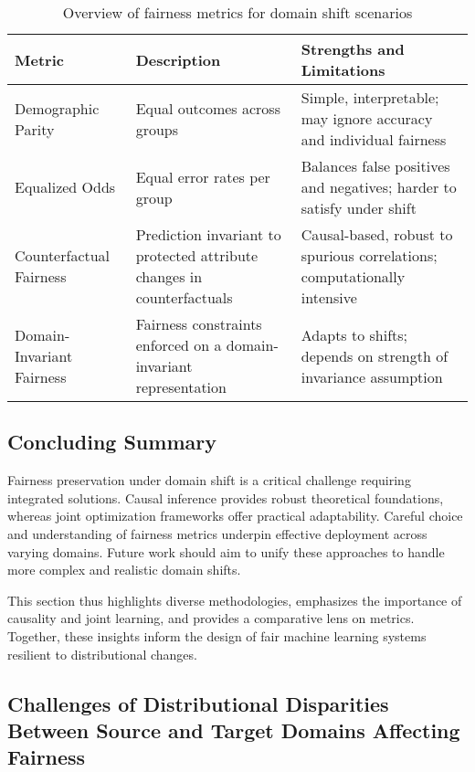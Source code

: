 \documentclass[sigconf]{acmart}
\begin{document}
\begin{table*}[htbp]
\centering
\caption{Overview of fairness metrics for domain shift scenarios}
\label{tab:fairness_domain_metrics}
\begin{adjustbox}{max width=\textwidth}
\begin{tabular}{@{}lll@{}}
\toprule
\textbf{Metric} & \textbf{Description} & \textbf{Strengths and Limitations} \\
\midrule
Demographic Parity & Equal outcomes across groups & Simple, interpretable; may ignore accuracy and individual fairness \\
Equalized Odds & Equal error rates per group & Balances false positives and negatives; harder to satisfy under shift \\
Counterfactual Fairness & Prediction invariant to protected attribute changes in counterfactuals & Causal-based, robust to spurious correlations; computationally intensive \\
Domain-Invariant Fairness & Fairness constraints enforced on a domain-invariant representation & Adapts to shifts; depends on strength of invariance assumption \\
\bottomrule
\end{tabular}
\end{adjustbox}
\end{table*}

\subsection{Concluding Summary}
Fairness preservation under domain shift is a critical challenge requiring integrated solutions. Causal inference provides robust theoretical foundations, whereas joint optimization frameworks offer practical adaptability. Careful choice and understanding of fairness metrics underpin effective deployment across varying domains. Future work should aim to unify these approaches to handle more complex and realistic domain shifts.

This section thus highlights diverse methodologies, emphasizes the importance of causality and joint learning, and provides a comparative lens on metrics. Together, these insights inform the design of fair machine learning systems resilient to distributional changes.

\subsection{Challenges of Distributional Disparities Between Source and Target Domains Affecting Fairness}
\end{document}
